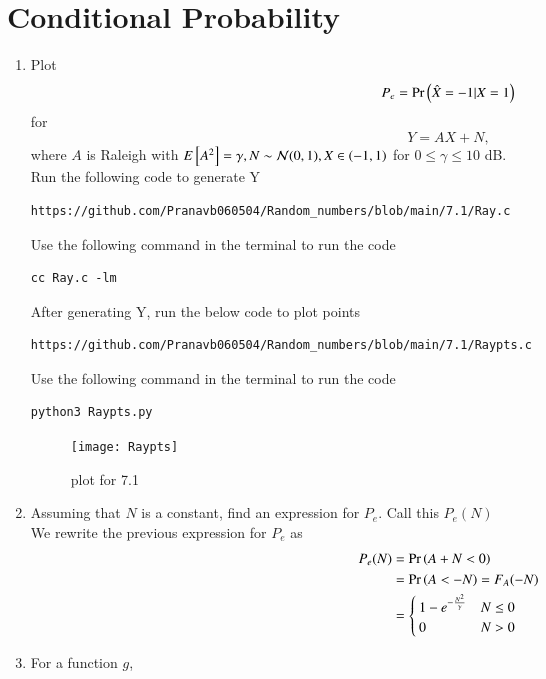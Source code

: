 \documentclass[journal,12pt,twocolumn]{IEEEtran}
\renewcommand\thesection{\arabic{section}}
\begin{document}
\section{Conditional Probability}
\begin{enumerate}[label=\thesection.\arabic*
,ref=\thesection.\theenumi]
\item
\label{ch4_sim}
Plot 
\begin{equation}
P_e = \Pr\left(\hat{X} = -1|X=1\right)
\end{equation}
%
for 
\begin{equation}
Y = AX+N,
\end{equation}
where $A$ is Raleigh with $E{}\left[A^2\right] = \gamma, N \sim \mathcal{N}(0, 1), X \in \left(-1,1\right)$ for $0 \le \gamma \le 10$ dB.\\
\solution
Run the following code to generate Y
\begin{lstlisting}
https://github.com/Pranavb060504/Random_numbers/blob/main/7.1/Ray.c
\end{lstlisting}
Use the following command in the terminal to run the code
\begin{lstlisting}
cc Ray.c -lm
\end{lstlisting}
After generating Y, run the below code to plot points
\begin{lstlisting}
https://github.com/Pranavb060504/Random_numbers/blob/main/7.1/Raypts.c
\end{lstlisting}
Use the following command in the terminal to run the code
\begin{lstlisting}
python3 Raypts.py
\end{lstlisting}
\begin{figure}[h]
\texttt{[image: Raypts]}
\caption{plot for 7.1}
\label{fig:Plot7.1}
\end{figure}
%
\item
Assuming that $N$ is a constant, find an expression for $P_e$.  Call this $P_e(N)$\\
\solution
We rewrite the previous expression for $P_e$ as
\begin{align}
	P_e(N) &=\Pr\left(A+N<0\right)\\ \nonumber
	&= \Pr\left(A < -N\right) = F_A(-N) \\
	&= 
	\begin{cases}
		1 - e^{-\frac{N^2}{\gamma}} & N \leq 0 \\
		0 & N > 0
	\end{cases}
\end{align}
%
\item
%
\label{ch4_anal}
For a function $g$,

\end{enumerate}
\end{document}

